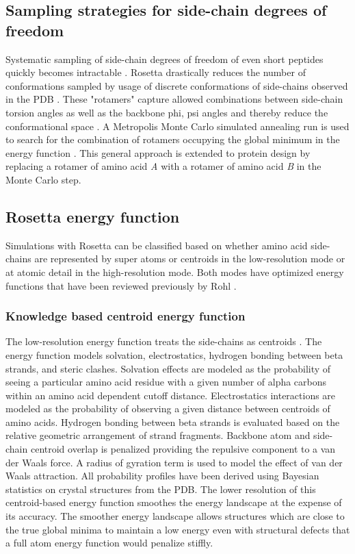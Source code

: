 \subsection{Sampling strategies for side-chain degrees of freedom}
Systematic sampling of side-chain degrees of freedom of even short peptides quickly becomes intractable  \citep{Levinthal:1968vd}.
Rosetta drastically reduces the number of conformations sampled by usage of discrete conformations of side-chains observed in the PDB  \citep{Kuhlman:2000tc,Dunbrack:1993jt}.
These "rotamers" capture allowed combinations between side-chain torsion angles as well as the backbone phi, psi angles and thereby reduce the conformational space  \citep{Dunbrack:1993jt}.
A Metropolis Monte Carlo simulated annealing run is used to search for the combination of rotamers occupying the global minimum in the energy function  \citep{Kuhlman:2000tc,LeaverFay:2005vc}.
This general approach is extended to protein design by replacing a rotamer of amino acid \textit{A} with a rotamer of amino acid \textit{B} in the Monte Carlo step.

\subsection{Rosetta energy function}
Simulations with Rosetta can be classified based on whether amino acid side-chains are represented by super atoms or centroids in the low-resolution mode or at atomic detail in the high-resolution mode.
Both modes have optimized energy functions that have been reviewed previously by Rohl  \citep{Rohl:2004dh}.

\subsubsection{Knowledge based centroid energy function}
The low-resolution energy function treats the side-chains as centroids  \citep{Simons:1997do,Simons:1999wp}.
The energy function models solvation, electrostatics, hydrogen bonding between beta strands, and steric clashes.
Solvation effects are modeled as the probability of seeing a particular amino acid residue with a given number of alpha carbons within an amino acid dependent cutoff distance.
Electrostatics interactions are modeled as the probability of observing a given distance between centroids of amino acids.
Hydrogen bonding between beta strands is evaluated based on the relative geometric arrangement of strand fragments.
Backbone atom and side-chain centroid overlap is penalized providing the repulsive component to a van der Waals force.
A radius of gyration term is used to model the effect of van der Waals attraction.
All probability profiles have been derived using Bayesian statistics on crystal structures from the \ac{PDB}.
The lower resolution of this centroid-based energy function smoothes the energy landscape at the expense of its accuracy.
The smoother energy landscape allows structures which are close to the true global minima to maintain a low energy even with structural defects that a full atom energy function would penalize stiffly.

